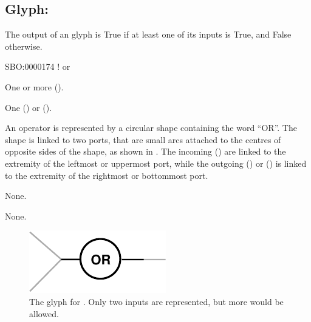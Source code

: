 \subsection{Glyph: }
\label{sec:or}

The output of an  glyph is True if at least one of its inputs is True, and False otherwise.

\begin{glyphDescription}

\glyphSboTerm
SBO:0000174 ! or

\glyphIncoming One or more  ().

\glyphOutgoing
One  () or  ().

\glyphContainer
An  operator is represented by a circular shape containing the word ``OR''.
The shape is linked to two ports, that are small arcs attached to the centres of opposite sides of the shape, as shown in .
The incoming  () are linked to the extremity of the leftmost or uppermost port, while the outgoing  () or  () is linked to the extremity of the rightmost or bottommost port.

\glyphLabel
None.

\glyphAux
None.

\end{glyphDescription}

\begin{figure}[H]
  \centering
  \includegraphics{images/build/or.pdf}
  \caption{The \PD glyph for . Only two inputs are represented, but more would be allowed.}
  \label{fig:or}
\end{figure}
